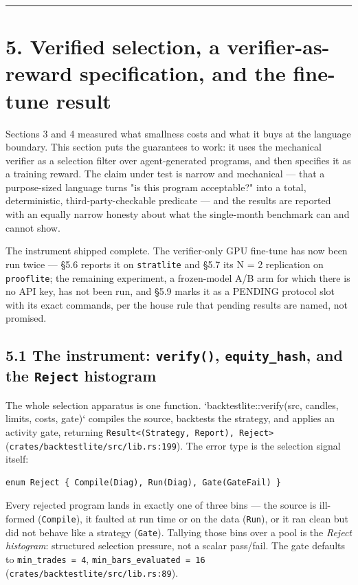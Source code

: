 \documentclass[11pt]{article}
\newcommand{\code}[1]{\texttt{#1}}
\begin{document}
\bigskip\hrule\bigskip

\section*{5. Verified selection, a verifier-as-reward specification, and the fine-tune result}

Sections 3 and 4 measured what smallness costs and what it buys at the language
boundary. This section puts the guarantees to work: it uses the mechanical
verifier as a selection filter over agent-generated programs, and then specifies
it as a training reward. The claim under test is narrow and mechanical --- that a
purpose-sized language turns "is this program acceptable?" into a total,
deterministic, third-party-checkable predicate --- and the results are reported
with an equally narrow honesty about what the single-month benchmark can and
cannot show.

The instrument shipped complete. The verifier-only GPU fine-tune has now been
run twice --- \S{}5.6 reports it on \code{stratlite} and \S{}5.7 its N = 2 replication on
\code{prooflite}; the remaining experiment, a frozen-model A/B arm for which there is
no API key, has not been run, and \S{}5.9 marks it as a PENDING protocol slot with
its exact commands, per the house rule that pending results are named, not
promised.

\subsection*{5.1 The instrument: \code{verify()}, \code{equity\_hash}, and the \code{Reject} histogram}

The whole selection apparatus is one function. `backtestlite::verify(src,
candles, limits, costs, gate)` compiles the source, backtests the strategy, and
applies an activity gate, returning \code{Result<(Strategy, Report), Reject>}
(\code{crates/backtestlite/src/lib.rs:199}). The error type is the selection signal
itself:

\begin{Verbatim}[fontsize=\small,frame=single,samepage=false]
enum Reject { Compile(Diag), Run(Diag), Gate(GateFail) }
\end{Verbatim}

Every rejected program lands in exactly one of three bins --- the source is
ill-formed (\code{Compile}), it faulted at run time or on the data (\code{Run}), or it ran
clean but did not behave like a strategy (\code{Gate}). Tallying those bins over a
pool is the \emph{Reject histogram}: structured selection pressure, not a scalar
pass/fail. The gate defaults to \code{min\_trades = 4}, \code{min\_bars\_evaluated = 16}
(\code{crates/backtestlite/src/lib.rs:89}).
\end{document}
